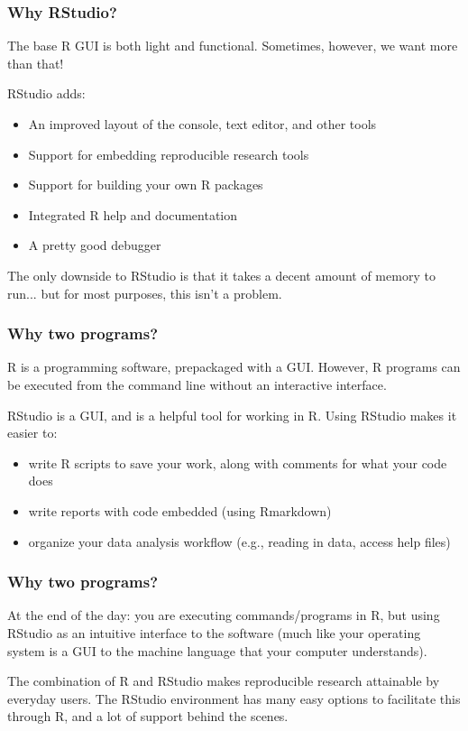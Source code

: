 \documentclass[11pt]{beamer}
\newcommand{\myframe}[1]{\begin{frame} \frametitle{#1}}
\newenvironment{spaceitemize}
{ \begin{itemize}
    \setlength{\itemsep}{10pt}
    \setlength{\parskip}{0pt}
    \setlength{\parsep}{0pt}     }
{ \end{itemize}                  }
\begin{document}
\myframe{Why RStudio?}
The base R GUI is both light and functional. Sometimes, however, we want more than that!

RStudio adds:
\begin{spaceitemize}
\item An improved layout of the console, text editor, and other tools
\item Support for embedding reproducible research tools
\item Support for building your own R packages
\item Integrated R help and documentation
\item A pretty good debugger
\end{spaceitemize}

The only downside to RStudio is that it takes a decent amount of memory to run... but for most purposes, this isn't a problem. 
\end{frame}


\myframe{Why two programs?}
R is a programming software, prepackaged with a GUI. However, R programs can be executed from the command line without an interactive interface.

RStudio is a GUI, and is a helpful tool for working in R. Using RStudio makes it easier to:
\begin{spaceitemize}
\item write R scripts to save your work, along with comments for what your code does
\item write reports with code embedded (using Rmarkdown)
\item organize your data analysis workflow (e.g., reading in data, access help files)
\end{spaceitemize}
\end{frame}

\myframe{Why two programs?}
At the end of the day: you are executing commands/programs in R, but using RStudio as an intuitive interface to the software (much like your operating system is a GUI to the machine language that your computer understands).

The combination of R and RStudio makes reproducible research attainable by everyday users. The RStudio environment has many easy options to facilitate this through R, and a lot of support behind the scenes.


\end{frame}
\end{document}
